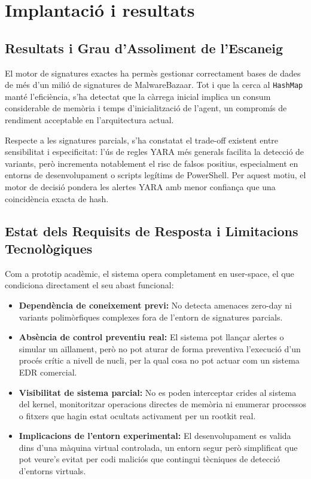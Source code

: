 \documentclass[12pt,a4paper]{report}
\begin{document}
\chapter{Implantació i resultats}
\label{ch:implantacio}

\section{Resultats i Grau d'Assoliment de l'Escaneig}
El motor de signatures exactes ha permès gestionar correctament bases de dades de més d'un milió de signatures de MalwareBazaar. Tot i que la cerca al \texttt{HashMap} manté l'eficiència, s'ha detectat que la càrrega inicial implica un consum considerable de memòria i temps d'inicialització de l'agent, un compromís de rendiment acceptable en l'arquitectura actual.

Respecte a les signatures parcials, s'ha constatat el trade-off existent entre sensibilitat i especificitat: l'ús de regles YARA més generals facilita la detecció de variants, però incrementa notablement el risc de falsos positius, especialment en entorns de desenvolupament o scripts legítims de PowerShell. Per aquest motiu, el motor de decisió pondera les alertes YARA amb menor confiança que una coincidència exacta de hash.

\section{Estat dels Requisits de Resposta i Limitacions Tecnològiques}
Com a prototip acadèmic, el sistema opera completament en user-space, el que condiciona directament el seu abast funcional:
\begin{itemize}
    \item \textbf{Dependència de coneixement previ:} No detecta amenaces zero-day ni variants polimòrfiques complexes fora de l'entorn de signatures parcials.
    \item \textbf{Absència de control preventiu real:} El sistema pot llançar alertes o simular un aïllament, però no pot aturar de forma preventiva l'execució d'un procés crític a nivell de nucli, per la qual cosa no pot actuar com un sistema EDR comercial.
    \item \textbf{Visibilitat de sistema parcial:} No es poden interceptar crides al sistema del kernel, monitoritzar operacions directes de memòria ni enumerar processos o fitxers que hagin estat ocultats activament per un rootkit real.
    \item \textbf{Implicacions de l'entorn experimental:} El desenvolupament es valida dins d'una màquina virtual controlada, un entorn segur però simplificat que pot veure's evitat per codi maliciós que contingui tècniques de detecció d'entorns virtuals.
\end{itemize}
\end{document}
